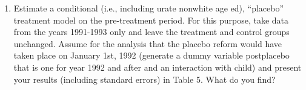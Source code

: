 \documentclass{article}
\begin{document}
\begin{enumerate}[label=\alph*]
\item Estimate a conditional (i.e., including urate nonwhite age ed), “placebo” treatment model on the pre-treatment period. For this purpose, take data from the years 1991-1993 only and leave the treatment and control groups unchanged. Assume for the analysis that the placebo reform would have taken place on January 1st, 1992 (generate a dummy variable postplacebo that is one for year 1992 and after and an interaction with child) and present your results (including standard errors) in Table 5. What do you find?

\end{enumerate}
\end{document}
